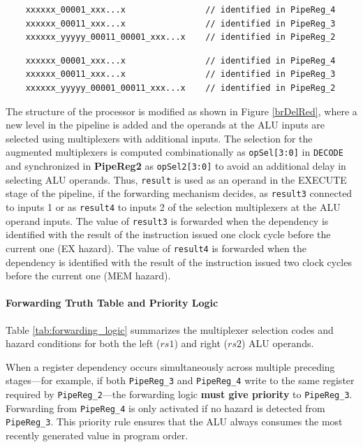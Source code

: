 \begin{verbatim}
    xxxxxx_00001_xxx...x                // identified in PipeReg_4
    xxxxxx_00011_xxx...x                // identified in PipeReg_3
    xxxxxx_yyyyy_00011_00001_xxx...x    // identified in PipeReg_2
\end{verbatim}

\begin{verbatim}
    xxxxxx_00001_xxx...x                // identified in PipeReg_4
    xxxxxx_00011_xxx...x                // identified in PipeReg_3
    xxxxxx_yyyyy_00001_00011_xxx...x    // identified in PipeReg_2
\end{verbatim}


The structure of the processor is modified as shown in Figure \ref{brDelRed}, where a new level in the pipeline is added and the operands at the ALU inputs are selected using multiplexers with additional inputs. The selection for the augmented multiplexers is computed combinationally as {\tt opSel[3:0]} in {\tt DECODE} and synchronized in {\bf PipeReg2} as {\tt opSel2[3:0]} to avoid an additional delay in selecting ALU operands. Thus, {\tt result} is used as an operand in the EXECUTE stage of the pipeline, if the forwarding mechanism decides, as {\tt result3} connected to inputs 1 or as {\tt result4} to inputs 2 of the selection multiplexers at the ALU operand inputs. The value of {\tt result3} is forwarded when the dependency is identified with the result of the instruction issued one clock cycle before the current one (EX hazard). The value of {\tt result4} is forwarded when the dependency is identified with the result of the instruction issued two clock cycles before the current one (MEM hazard).

\paragraph{Forwarding Truth Table and Priority Logic}
Table \ref{tab:forwarding_logic} summarizes the multiplexer selection codes and hazard conditions for both the left ($rs1$) and right ($rs2$) ALU operands. 

When a register dependency occurs simultaneously across multiple preceding stages---for example, if both \texttt{PipeReg\_3} and \texttt{PipeReg\_4} write to the same register required by \texttt{PipeReg\_2}---the forwarding logic \textbf{must give priority} to \texttt{PipeReg\_3}. Forwarding from \texttt{PipeReg\_4} is only activated if no hazard is detected from \texttt{PipeReg\_3}. This priority rule ensures that the ALU always consumes the most recently generated value in program order.

